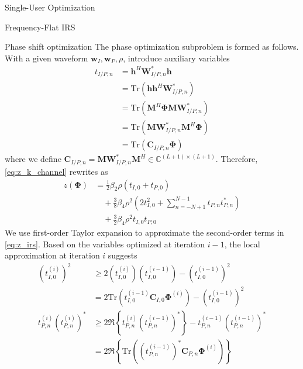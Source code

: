 \documentclass{IEEEtran}
\begin{document}
\begin{section}{Single-User Optimization}
\begin{subsection}{Frequency-Flat IRS}
		\begin{subsubsection}{Phase shift optimization}\label{se:fs_irs}
			The phase optimization subproblem is formed as follows. With a given waveform $\boldsymbol{w}_I,\boldsymbol{w}_P,\rho$, introduce auxiliary variables
			\begin{equation}\label{eq:t}
				\begin{split}
					t_{I/P,n}
					&=\boldsymbol{h}^H\boldsymbol{W}_{I/P,n}^*\boldsymbol{h}\\
					&=\mathrm{Tr}(\boldsymbol{h}\boldsymbol{h}^H\boldsymbol{W}_{I/P,n}^*)\\
					&=\mathrm{Tr}(\boldsymbol{M}^H\boldsymbol{\Phi}\boldsymbol{M}\boldsymbol{W}_{I/P,n}^*)\\
					&=\mathrm{Tr}(\boldsymbol{M}\boldsymbol{W}_{I/P,n}^*\boldsymbol{M}^H\boldsymbol{\Phi})\\
					&=\mathrm{Tr}(\boldsymbol{C}_{I/P,n}\boldsymbol{\Phi})
				\end{split}
			\end{equation}
			where we define $\boldsymbol{C}_{I/P,n}=\boldsymbol{M}\boldsymbol{W}_{I/P,n}^*\boldsymbol{M}^H \in \mathbb{C}^{(L+1)\times(L+1)}$. Therefore, \ref{eq:z_k_channel} rewrites as
			\begin{equation}\label{eq:z_irs}
				\begin{split}
					z(\boldsymbol{\Phi})
					&=\frac{1}{2}{\beta_2}{\rho}(t_{I,0}+t_{P,0})\\
					&\quad+\frac{3}{8}{\beta_4}{\rho^2} \left(2t_{I,0}^2 + \sum_{n=-N+1}^{N-1}{t_{P,n}t_{P,n}^*}\right)\\
					&\quad+\frac{3}{2}{\beta_4}{\rho^2}t_{I,0}t_{P,0}
				\end{split}
			\end{equation}
			We use first-order Taylor expansion to approximate the second-order terms in \ref{eq:z_irs}. Based on the variables optimized at iteration $i - 1$, the local approximation at iteration $i$ suggests \cite{Adali2010}
			\begin{align}
				(t_{I,0}^{(i)})^2
				& \ge 2 (t_{I,0}^{(i)})(t_{I,0}^{(i-1)}) - (t_{I,0}^{(i-1)})^2\nonumber\\
				& = 2 \mathrm{Tr}(t_{I,0}^{(i-1)}\boldsymbol{C}_{I,0}\boldsymbol{\Phi}^{(i)}) - (t_{I,0}^{(i-1)})^2\label{eq:t_approx_1}\\
				t_{P,n}^{(i)} (t_{P,n}^{(i)})^*
				& \ge 2 \Re\left\{t_{P,n}^{(i)} (t_{P,n}^{(i-1)})^*\right\} - t_{P,n}^{(i-1)} (t_{P,n}^{(i-1)})^*\nonumber\\
				& = 2 \Re \left\{\mathrm{Tr}\left((t_{P,n}^{(i-1)})^*\boldsymbol{C}_{P,n}\boldsymbol{\Phi}^{(i)}\right)\right\}\nonumber\\

\end{align}
\end{subsubsection}
\end{subsection}
\end{section}
\end{document}
